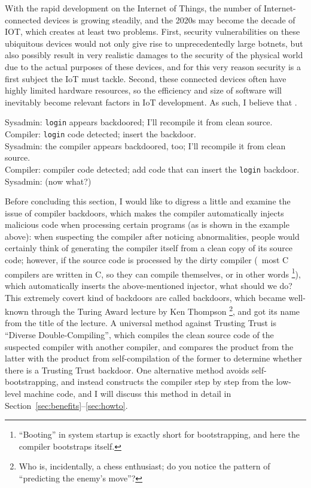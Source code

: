 With the rapid development on the Internet of Things, the number of
Internet-connected devices is growing steadily, and the 2020s may become
the decade of IOT, which creates at least two problems.  First, security
vulnerabilities on these ubiquitous devices would not only give rise to
unprecedentedly large botnets, but also possibly result in very realistic
damages to the security of the physical world due to the actual purposes of
these devices, and for this very reason security is a first subject the IoT must
tackle.  Second, these connected devices often have highly limited hardware
resources, so the efficiency and size of software will inevitably become
relevant factors in IoT development.  As such, I believe that .

\begin{quoting}
	Sysadmin: \verb|login| appears backdoored;
		I'll recompile it from clean source.\\
	Compiler: \verb|login| code detected; insert the backdoor.\\
	Sysadmin: the compiler appears backdoored, too;
		I'll recompile it from clean source.\\
	Compiler: compiler code detected; add code
		that can insert the \verb|login| backdoor.\\
	Sysadmin: (now what?)
\end{quoting}\par
Before concluding this section, I would like to digress a little
and examine the issue of compiler backdoors, which makes the compiler
automatically injects malicious code when processing certain programs
(as is shown in the example above): when suspecting the compiler after
noticing abnormalities, people would certainly think of generating the
compiler itself from a clean copy of its source code; however, if the source
code is processed by the dirty compiler (\eg~most C compilers are written in C,
so they can compile themselves, or in other words %
\footnote{``Booting'' in system startup is exactly short for bootstrapping,
and here the compiler bootstraps itself.}), which automatically inserts the
above-mentioned injector, what should we do?  This extremely covert kind of
backdoors are called  backdoors, which became well-known
through the Turing Award lecture by Ken Thompson%
\footnote{Who is, incidentally, a chess enthusiast; do you notice the
pattern of ``predicting the enemy's move''?}, and got its name from the
title of the lecture.  A universal method against Trusting Trust is ``Diverse
Double-Compiling'', which compiles the clean source code
of the suspected compiler with another compiler, and compares the product from
the latter with the product from self-compilation of the former to determine
whether there is a Trusting Trust backdoor.  One alternative method avoids
self-bootstrapping, and instead constructs the compiler step by step from
the low-level machine code, and I will discuss
this method in detail in Section~\ref{sec:benefits}--\ref{sec:howto}.

